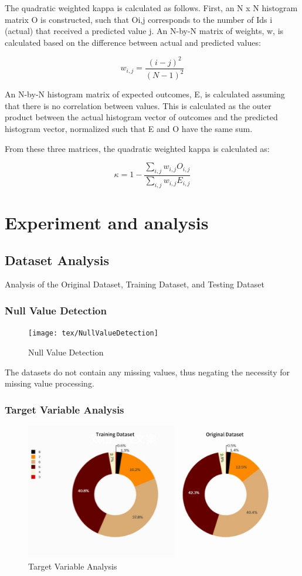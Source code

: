 The quadratic weighted kappa is calculated as follows. First, an N x N histogram matrix O is constructed, such that Oi,j corresponds to the number of Ids i (actual) that received a predicted value j. An N-by-N matrix of weights, w, is calculated based on the difference between actual and predicted values:

\[ w_{i,j} = \frac{(i - j)^2}{(N - 1)^2} \]

An N-by-N histogram matrix of expected outcomes, E, is calculated assuming that there is no correlation between values.  This is calculated as the outer product between the actual histogram vector of outcomes and the predicted histogram vector, normalized such that E and O have the same sum.

From these three matrices, the quadratic weighted kappa is calculated as: 

\[ \kappa = 1 - \frac{\sum_{i,j} w_{i,j} O_{i,j}}{\sum_{i,j} w_{i,j} E_{i,j}} \]

\section{Experiment and analysis}
\subsection{Dataset Analysis}\phantom{...}

Analysis of the Original Dataset, Training Dataset, and Testing Dataset

\subsubsection{Null Value Detection}\phantom{...}

\begin{figure}[H]
	\centering
	\texttt{[image: tex/NullValueDetection]}
	\caption{Null Value Detection}
	\label{fig:nullvaluedetection}
\end{figure}

The datasets do not contain any missing values, thus negating the necessity for missing value processing.

\subsubsection{Target Variable Analysis}\phantom{...}

\begin{figure}[H]
	\centering
	\includegraphics[width=0.8\linewidth]{tex/TargetVariableAnalysis}
	\caption{Target Variable Analysis}
	\label{fig:targetvariableanalysis}
\end{figure}

